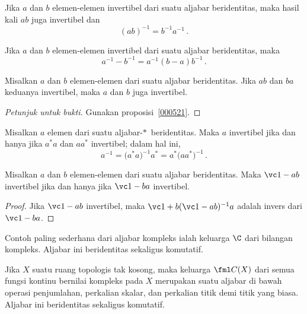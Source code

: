 \begin{prop} Jika $a$ dan $b$ elemen-elemen invertibel dari suatu aljabar beridentitas, maka hasil kali
$ab$ juga invertibel dan
  \[ (ab)^{-1} = b^{-1}a^{-1}\,. \]
\end{prop}

\begin{prop}\label{000524} Jika $a$ dan $b$ elemen-elemen invertibel dari suatu aljabar beridentitas,
maka
  \[ a^{-1} - b^{-1} = a^{-1}(b - a)b^{-1}\,. \]
\end{prop}

\begin{prop} Misalkan $a$ dan $b$ elemen-elemen dari suatu aljabar beridentitas. Jika $ab$ dan
$ba$ keduanya invertibel, maka $a$ dan $b$ juga invertibel.
\end{prop}

\begin{proof}[\emph{Petunjuk untuk bukti}] Gunakan proposisi~\ref{000521}. \ns \end{proof}

\begin{cor} Misalkan $a$ elemen dari suatu aljabar-$*\,$ beridentitas. Maka $a$ invertibel jika dan hanya jika $a^*a$ dan $aa^*$
invertibel; dalam hal ini,
   \[ a^{-1} = \bigl(a^*a\bigr)^{-1}a^* = a^*\big(aa^*\bigr)^{-1}\,. \]
\end{cor}

\begin{prop}\label{000526} Misalkan $a$ dan $b$ elemen-elemen dari suatu aljabar beridentitas. Maka
$\vc 1 - ab$ invertibel jika dan hanya jika $\vc 1 - ba$ invertibel.
\end{prop}

\begin{proof} Jika $\vc 1 - ab$ invertibel, maka $\vc 1 + b(\vc 1 - ab)^{-1}a$ adalah
invers dari $\vc 1 - ba$.
\end{proof}

\begin{exam} Contoh paling sederhana dari aljabar kompleks ialah keluarga $\C$ dari bilangan
kompleks. Aljabar ini beridentitas sekaligus komutatif.
\end{exam}

\begin{exam}\label{000532} Jika $X$ suatu ruang topologis tak kosong, maka keluarga $\fml C(X)$
dari semua fungsi kontinu bernilai kompleks pada $X$ merupakan suatu
aljabar di bawah operasi penjumlahan, perkalian skalar, dan perkalian titik demi titik yang biasa.
Aljabar ini beridentitas sekaligus komutatif.
\end{exam}

